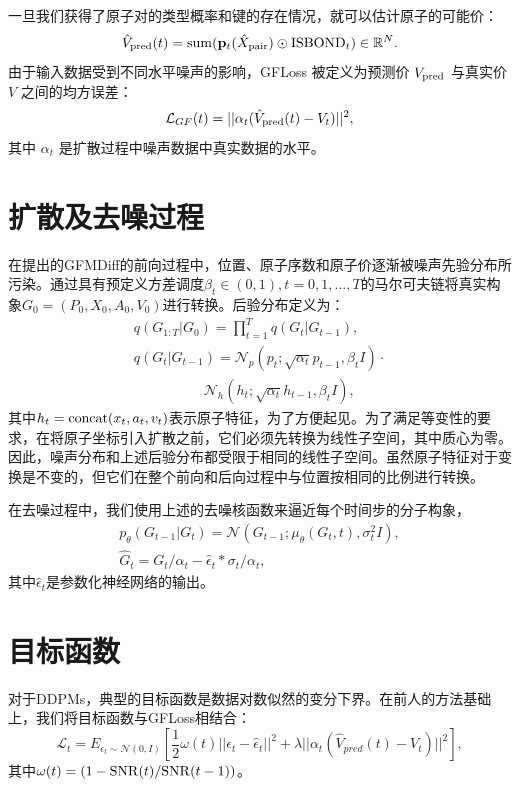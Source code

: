 一旦我们获得了原子对的类型概率和键的存在情况，就可以估计原子的可能价：
\begin{equation}
     \hat{V}_{{\rm pred}}(t) = {\rm sum}({\mathbf{p}}_t(\hat{X}_{{\rm pair}}) \odot {\rm ISBOND}_t) \in \mathbb{R}^{N}.
\end{equation}
由于输入数据受到不同水平噪声的影响，GFLoss 被定义为预测价 $V_{{\rm pred}}$ 与真实价 $V$ 之间的均方误差：
\begin{equation}
    \mathcal{L}_{GF}(t) = ||\alpha_t(\hat{V}_{{\rm pred}}(t) - V_t)||^2,
\end{equation}
其中 $\alpha_t$ 是扩散过程中噪声数据中真实数据的水平。

\section{扩散及去噪过程}

在提出的GFMDiff的前向过程中，位置、原子序数和原子价逐渐被噪声先验分布所污染。通过具有预定义方差调度$\beta_t \in (0, 1), t=0, 1, ..., T$的马尔可夫链将真实构象$G_0 = (P_0, X_0, A_0, V_0)$进行转换。后验分布定义为：
\begin{eqnarray}
    &q(G_{1:T}|G_0) = \prod^T_{t=1} q(G_t|G_{t-1}),& \\
    &q(G_t|G_{t-1}) = \mathcal{N}_p(p_t;\sqrt{\alpha_t} p_{t-1}, \beta_t I) \cdot \\
    & \quad \quad \quad \quad \quad \mathcal{N}_h(h_t;\sqrt{\alpha_t} h_{t-1}, \beta_t I),&
\end{eqnarray}
其中$h_t = {\rm concat}(x_t, a_t, v_t)$表示原子特征，为了方便起见。为了满足等变性的要求，在将原子坐标引入扩散之前，它们必须先转换为线性子空间，其中质心为零\cite{enf_satorras_21,edm_hoogeboom_22,geodiff_xu_22}。因此，噪声分布和上述后验分布都受限于相同的线性子空间。虽然原子特征对于变换是不变的，但它们在整个前向和后向过程中与位置按相同的比例进行转换。

在去噪过程中，我们使用上述的去噪核函数来逼近每个时间步的分子构象，
\begin{eqnarray}
    &p_\theta(G_{t-1}|G_t) = \mathcal{N}(G_{t-1}; \mu_\theta(G_t,t),\sigma_t^2 I),& \\
    &\hat{G}_t = G_t / \alpha_t - \hat{\epsilon}_t * \sigma_t / \alpha_t ,&
\end{eqnarray}
其中$\hat{\epsilon}_t$是参数化神经网络的输出。

\section{目标函数}

对于DDPMs，典型的目标函数是数据对数似然的变分下界。在前人的方法基础上，我们将目标函数与GFLoss相结合：
\begin{equation}
    \mathcal{L}_t = E_{\epsilon_t \sim \mathcal{N}(0, I)}[\frac{1}{2}\omega(t)||\epsilon_t - \hat{\epsilon}_t||^2 + \lambda ||\alpha_t(\hat{V}_{pred}(t) - V_t)||^2],
\end{equation}
其中$\omega(t) = (1-{\rm SNR}(t)/{\rm SNR}(t-1))$。

